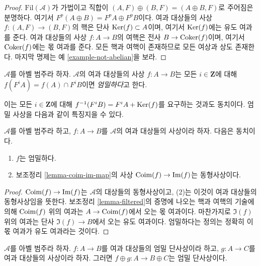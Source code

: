 \begin{proof}
$\text{Fil}(\mathcal{A})$가 가법이고 직합이
$(A, F) \oplus (B, F) = (A \oplus B, F)$로 주어짐은 분명하다.
여기서 $F^p(A \oplus B) = F^pA \oplus F^pB$이다.
여과 대상들의 사상 $f : (A, F) \to (B, F)$의 핵은 단사
$\mathop{\mathrm{Ker}}(f) \subset A$이며, 여기서 $\mathop{\mathrm{Ker}}(f)$에는 유도 여과를 준다.
여과 대상들의 사상 $f : A \to B$의 여핵은 전사
$B \to \mathop{\mathrm{Coker}}(f)$이며, 여기서 $\mathop{\mathrm{Coker}}(f)$에는 몫 여과를 준다.
모든 핵과 여핵이 존재하므로 모든 여상과 상도 존재한다. 마지막 명제는
예 \ref{example-not-abelian}을 보라.
\end{proof}

\begin{definition}
\label{definition-strict}
$\mathcal{A}$를 아벨 범주라 하자. $\mathcal{A}$의 여과 대상들의 사상
$f : A \to B$는 모든 $i \in \mathbf{Z}$에 대해
$f(F^iA) = f(A) \cap F^iB$이면 {\it 엄밀하다}고 한다.
\end{definition}

\noindent
이는 모든 $i \in \mathbf{Z}$에 대해
$f^{-1}(F^iB) = F^iA + \mathop{\mathrm{Ker}}(f)$를 요구하는 것과도 동치이다.
엄밀 사상을 다음과 같이 특징지을 수 있다.

\begin{lemma}
\label{lemma-characterize-strict-general}
$\mathcal{A}$를 아벨 범주라 하고, $f : A \to B$를
$\mathcal{A}$의 여과 대상들의 사상이라 하자. 다음은 동치이다.
\begin{enumerate}
\item $f$는 엄밀하다.
\item 보조정리 \ref{lemma-coim-im-map}의 사상
$\mathop{\mathrm{Coim}}(f) \to \mathop{\mathrm{Im}}(f)$는 동형사상이다.
\end{enumerate}
\end{lemma}

\begin{proof}
$\mathop{\mathrm{Coim}}(f) \to \mathop{\mathrm{Im}}(f)$는 $\mathcal{A}$의 대상들의 동형사상이고,
(2)는 이것이 여과 대상들의 동형사상임을 뜻한다.
보조정리 \ref{lemma-filtered}의 증명에 나오는 핵과 여핵의 기술에 의해
$\mathop{\mathrm{Coim}}(f)$ 위의 여과는 $A \to \mathop{\mathrm{Coim}}(f)$에서 오는 몫 여과이다.
마찬가지로 $\Im(f)$ 위의 여과는 단사
$\Im(f) \to B$에서 오는 유도 여과이다. 엄밀하다는 정의는 정확히
이 몫 여과가 유도 여과라는 것이다.
\end{proof}

\begin{lemma}
\label{lemma-add-summand-strict-monomorphism}
$\mathcal{A}$를 아벨 범주라 하자. $f : A \to B$를 여과 대상들의
엄밀 단사상이라 하고, $g : A \to C$를 여과 대상들의 사상이라 하자.
그러면 $f \oplus g : A \to B \oplus C$는 엄밀 단사상이다.
\end{lemma}

